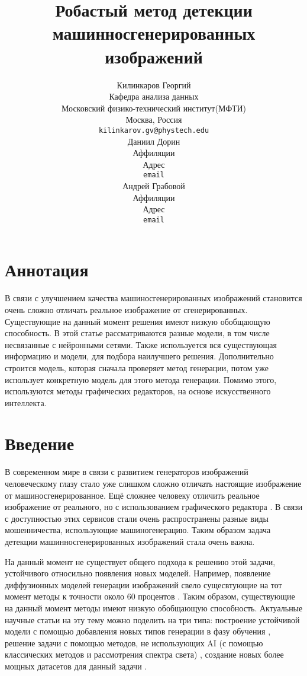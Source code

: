 \documentclass{article}
\title{Робастый метод детекции машинносгенерированных изображений}
\author{%
    Килинкаров Георгий \\
    Кафедра анализа данных\\
    Московский физико-технический институт(МФТИ)\\
    Москва, Россия\\
    \texttt{kilinkarov.gv@phystech.edu} \\
    \And
    Даниил Дорин  \\
    Аффиляции \\
    Адрес \\
    \texttt{email} \\
    \AND
    Андрей Грабовой \\
    Аффиляции \\
    Адрес \\
    \texttt{email}
}
\date{}
\begin{document}
\maketitle

\section{Аннотация}
В связи с улучшением качества машиносгенерированных изображений становится очень сложно отличать реальное изображение от сгенерированных.  Существующие на данный момент решения имеют низкую обобщающую способность. В этой статье рассматриваются разные модели, в том числе несвязанные с нейронными сетями. Также используется вся существующая информацию и модели, для подбора наилучшего решения. Дополнительно строится модель, которая сначала проверяет метод генерации, потом уже использует конкретную модель для этого метода генерации. Помимо этого, используются методы графических редакторов, на основе искусственного интеллекта.



\section{Введение}
\label{sec:introduction}

В современном мире в связи с развитием генераторов изображений человеческому глазу стало уже слишком сложно отличать настоящие изображение от машиносгенерированное. Ещё сложнее человеку отличить реальное изображение от реального, но с использованием графического редактора \cite{OnlineDetection}. В связи с доступностью этих сервисов стали очень распространены разные виды мошенничества, использующие машиногенерацию. Таким образом задача детекции машинносгенерированных изображений стала очень важна.


На данный момент не существует общего подхода к решению этой задачи, устойчивого относильно появления новых моделей. Например, появление диффузионных моделей генерации изображений свело сущесвтующие на тот момент методы к точности около 60 процентов \cite{GenImage}. Таким образом, существующие на данный момент методы имеют низкую обобщающую способность. Актуальные научные статьи на эту тему можно поделить на три типа: построение устойчивой модели с помощью добавления новых типов генерации в фазу обучения \cite{AivsAi, OnlineDetection}, решение задачи с помощью методов, не использующих AI (с помощью классических методов и рассмотрения спектра света) \cite{ZeroShot}, создание новых более мощных датасетов для данный задачи \cite{GenImage, CIFAKE}.
\end{document}
